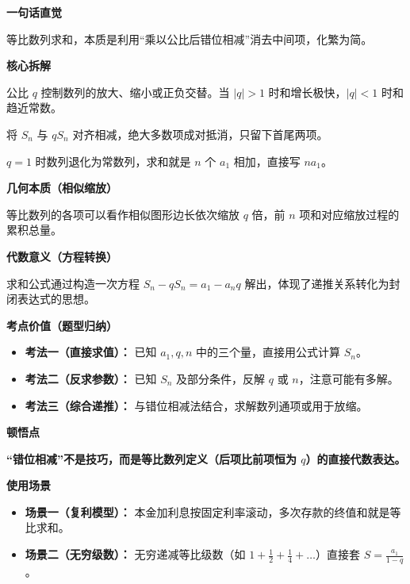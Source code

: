\begin{explanationbox}
\textbf{\textcolor{CExplanation}{一句话直觉}}

等比数列求和，本质是利用“乘以公比后错位相减”消去中间项，化繁为简。

\medskip
\textbf{\textcolor{CExplanation}{核心拆解}}
\begin{description}[style=nextline, leftmargin=2.8em, labelsep=0.5em, itemsep=0.45em]
    \item[\textbf{要点一（公比作用）：}] 公比 $q$ 控制数列的放大、缩小或正负交替。当 $|q|>1$ 时和增长极快，$|q|<1$ 时和趋近常数。
    \item[\textbf{要点二（错位消去）：}] 将 $S_n$ 与 $qS_n$ 对齐相减，绝大多数项成对抵消，只留下首尾两项。
    \item[\textbf{要点三（分类讨论）：}] $q=1$ 时数列退化为常数列，求和就是 $n$ 个 $a_1$ 相加，直接写 $na_1$。
\end{description}

\medskip
\textbf{\textcolor{CExplanation}{几何本质（相似缩放）}}

等比数列的各项可以看作相似图形边长依次缩放 $q$ 倍，前 $n$ 项和对应缩放过程的累积总量。

\medskip
\textbf{\textcolor{CExplanation}{代数意义（方程转换）}}

求和公式通过构造一次方程 $S_n - q S_n = a_1 - a_n q$ 解出，体现了递推关系转化为封闭表达式的思想。

\medskip
\textbf{\textcolor{CExplanation}{考点价值（题型归纳）}}
\begin{itemize}[leftmargin=*, itemsep=0.5em, topsep=0.4em]
    \item \textbf{考法一（直接求值）：} 已知 $a_1,q,n$ 中的三个量，直接用公式计算 $S_n$。
    \item \textbf{考法二（反求参数）：} 已知 $S_n$ 及部分条件，反解 $q$ 或 $n$，注意可能有多解。
    \item \textbf{考法三（综合递推）：} 与错位相减法结合，求解数列通项或用于放缩。
\end{itemize}

\medskip
\textbf{\textcolor{CExplanation}{顿悟点}}

\textbf{“错位相减”不是技巧，而是等比数列定义（后项比前项恒为 $q$）的直接代数表达。}

\medskip
\textbf{\textcolor{CExplanation}{使用场景}}
\begin{itemize}[leftmargin=*, itemsep=0.5em, topsep=0.4em]
    \item \textbf{场景一（复利模型）：} 本金加利息按固定利率滚动，多次存款的终值和就是等比求和。
    \item \textbf{场景二（无穷级数）：} 无穷递减等比级数（如 $1+\frac12+\frac14+\dots$）直接套 $S=\frac{a_1}{1-q}$。
\end{itemize}
\end{explanationbox}
